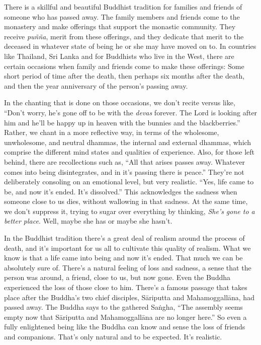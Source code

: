 
There is a skillful and beautiful Buddhist tradition for families and 
friends of someone who has passed away. The family members and friends 
come to the monastery and make offerings that support the monastic 
community. They receive \emph{puñña}, merit from these offerings, and 
they dedicate that merit to the deceased in whatever state of being he 
or she may have moved on to. In countries like Thailand, Sri Lanka and 
for Buddhists who live in the West, there are certain occasions when 
family and friends come to make these offerings: Some short period of 
time after the death, then perhaps six months after the death, and then 
the year anniversary of the person's passing away.

In the chanting that is done on those occasions, we don't recite versus 
like, ``Don't worry, he's gone off to be with the \emph{devas} forever. 
The Lord is looking after him and he'll be happy up in heaven with the 
bunnies and the blackberries.'' Rather, we chant in a more reflective 
way, in terms of the wholesome, unwholesome, and neutral dhammas, the 
internal and external dhammas, which comprise the different mind states 
and qualities of experience. Also, for those left behind, there are 
recollections such as, ``All that arises passes away. Whatever comes 
into being disintegrates, and in it's passing there is peace.'' They're 
not deliberately consoling on an emotional level, but very realistic. 
``Yes, life came to be, and now it's ended. It's dissolved.'' This 
acknowledges the sadness when someone close to us dies, without 
wallowing in that sadness. At the same time, we don't suppress it, 
trying to sugar over everything by thinking, \emph{She's gone to a 
better place}. Well, maybe she has or maybe she hasn't.

In the Buddhist tradition there's a great deal of realism around the 
process of death, and it's important for us all to cultivate this 
quality of realism. What we know is that a life came into being and now 
it's ended. That much we can be absolutely sure of. There's a natural 
feeling of loss and sadness, a sense that the person was around, a 
friend, close to us, but now gone. Even the Buddha experienced the loss 
of those close to him. There's a famous passage that takes place after 
the Buddha's two chief disciples, Sāriputta and Mahamoggallāna, had 
passed away. The Buddha says to the gathered Saṅgha, ``The assembly 
seems empty now that Sāriputta and Mahamoggallāna are no longer 
here.'' So even a fully enlightened being like the Buddha can know and 
sense the loss of friends and companions. That's only natural and to be 
expected. It's realistic.

